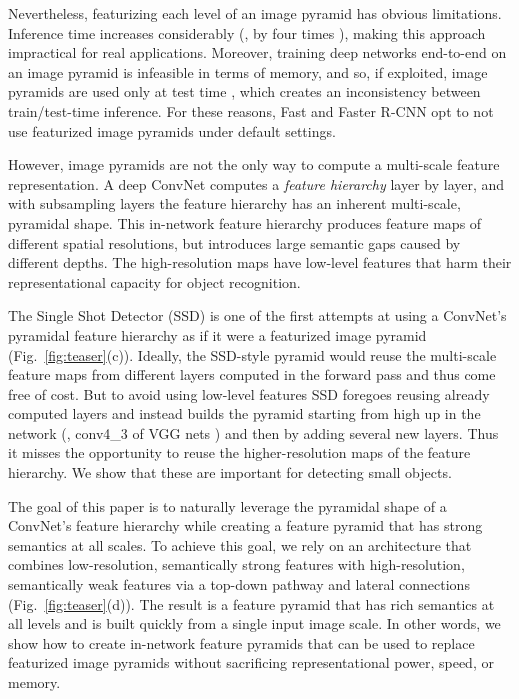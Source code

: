 \documentclass[10pt,twocolumn,letterpaper]{article}
\begin{document}
Nevertheless, featurizing each level of an image pyramid has obvious limitations.
Inference time increases considerably (\eg, by four times \cite{Girshick2015a}), making this approach impractical for real applications.
Moreover, training deep networks end-to-end on an image pyramid is infeasible in terms of memory, and so, if exploited, image pyramids are used only at test time \cite{He2014,Girshick2015a,He2016,Shrivastava2016}, which creates an inconsistency between train/test-time inference.
For these reasons, Fast and Faster R-CNN \cite{Girshick2015a,Ren2015a} opt to not use featurized image pyramids under default settings.

However, image pyramids are not the only way to compute a multi-scale feature representation.
A deep ConvNet computes a \emph{feature hierarchy} layer by layer, and with subsampling layers the feature hierarchy has an inherent multi-scale, pyramidal shape.
This in-network feature hierarchy produces feature maps of different spatial resolutions, but introduces large semantic gaps caused by different depths.
The high-resolution maps have low-level features that harm their representational capacity for object recognition.

The Single Shot Detector (SSD) \cite{Liu2016} is one of the first attempts at using a ConvNet's pyramidal feature hierarchy as if it were a featurized image pyramid (Fig.~\ref{fig:teaser}(c)). Ideally, the SSD-style pyramid would reuse the multi-scale feature maps from different layers computed in the forward pass and thus come free of cost.
But to avoid using low-level features SSD foregoes reusing already computed layers and instead builds the pyramid starting from high up in the network (\eg,  conv4\_3 of VGG nets \cite{Simonyan2015}) and then by adding several new layers.
Thus it misses the opportunity to reuse the higher-resolution maps of the feature hierarchy.
We show that these are important for detecting small objects.

The goal of this paper is to naturally leverage the pyramidal shape of a ConvNet's feature hierarchy while creating a feature pyramid that has strong semantics at all scales.
To achieve this goal, we rely on an architecture that combines low-resolution, semantically strong features with high-resolution, semantically weak features via a top-down pathway and lateral connections (Fig.~\ref{fig:teaser}(d)).
The result is a feature pyramid that has rich semantics at all levels and is built quickly from a single input image scale.
In other words, we show how to create in-network feature pyramids that can be used to replace featurized image pyramids without sacrificing representational power, speed, or memory.
\end{document}
